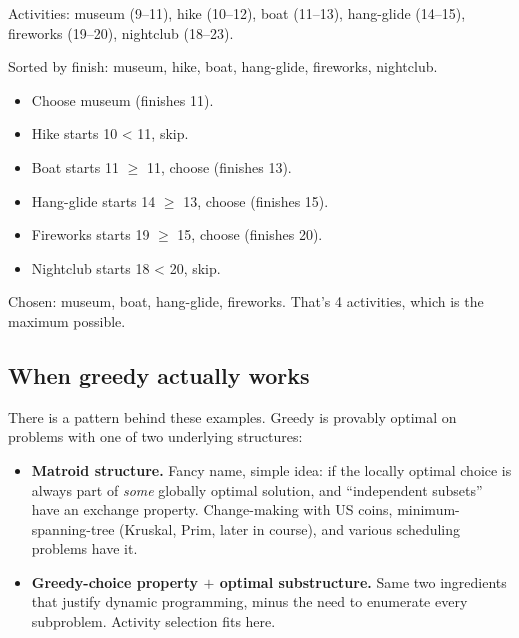 \documentclass[11pt]{article}
\begin{document}
\begin{examplebox}
Activities: museum (9--11), hike (10--12), boat (11--13), hang-glide
(14--15), fireworks (19--20), nightclub (18--23).

Sorted by finish: museum, hike, boat, hang-glide, fireworks,
nightclub.

\begin{itemize}[leftmargin=*,noitemsep]
    \item Choose museum (finishes 11).
    \item Hike starts 10 < 11, skip.
    \item Boat starts 11 $\ge$ 11, choose (finishes 13).
    \item Hang-glide starts 14 $\ge$ 13, choose (finishes 15).
    \item Fireworks starts 19 $\ge$ 15, choose (finishes 20).
    \item Nightclub starts 18 < 20, skip.
\end{itemize}
Chosen: museum, boat, hang-glide, fireworks. That's 4 activities,
which is the maximum possible.
\end{examplebox}

\subsection{When greedy actually works}

There is a pattern behind these examples. Greedy is provably optimal
on problems with one of two underlying structures:

\begin{itemize}[leftmargin=*]
    \item \textbf{Matroid structure.} Fancy name, simple idea: if the
          locally optimal choice is always part of \emph{some}
          globally optimal solution, and ``independent subsets'' have
          an exchange property. Change-making with US coins,
          minimum-spanning-tree (Kruskal, Prim, later in course), and
          various scheduling problems have it.
    \item \textbf{Greedy-choice property $+$ optimal substructure.}
          Same two ingredients that justify dynamic programming,
          minus the need to enumerate every subproblem. Activity
          selection fits here.
\end{itemize}
\end{document}
